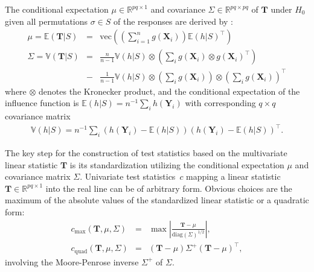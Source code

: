 \documentclass{article}
\newcommand{\Rpackage}[1]{{\normalfont\fontseries{b}\selectfont #1}}
\newcommand{\R}{\mathbb{R} }
\newcommand{\V}{\mathbb{V}} %
\newcommand{\E}{\mathbb{E}} %
\newcommand{\X}{\mathbf{X}}
\newcommand{\Y}{\mathbf{Y}}
\newcommand{\T}{\mathbf{T}}
\renewcommand{\vec}{\text{vec}}
\begin{document}
The conditional expectation $\mu \in \R^{pq \times 1}$ and covariance
$\Sigma \in \R^{pq \times pq}$ of $\T$ under $H_0$ given
all permutations $\sigma \in S$ of the responses are derived by
\cite{StrasserWeber1999}:
\begin{eqnarray*}
\mu = \E(\T | S) & = & \vec \left( \left( \sum_{i = 1}^n g(\X_i) \right)
\E(h | S)^\top \right) \\
\Sigma = \V(\T | S) & = &
    \frac{n}{n - 1}  \V(h | S) \otimes
        \left(\sum_i g(\X_i) \otimes  g(\X_i)^\top \right)
\\
& - & \frac{1}{n - 1}  \V(h | S)  \otimes \left(
        \sum_i g(\X_i) \right) \otimes \left( \sum_i g(\X_i)\right)^\top
\nonumber
\end{eqnarray*}
where $\otimes$ denotes the Kronecker product, and the conditional
expectation of the influence function is $\E(h | S) = n^{-1} \sum_i
h(\Y_i)$ with corresponding $q \times q$ covariance matrix
\begin{eqnarray*}
\V(h | S) = n^{-1} \sum_i \left(h(\Y_i) - \E(h | S) \right) \left(h(\Y_i) - \E(h | S)\right)^\top.
\end{eqnarray*}

The key step for the construction of test statistics based on the multivariate
linear statistic $\T$ is its standardization utilizing the 
conditional expectation $\mu$ and covariance matrix $\Sigma$. 
Univariate test statistics~$c$ mapping a linear
statistic $\T \in \R^{pq \times 1}$ 
into the real line can be of arbitrary form.  Obvious choices are
the maximum of the absolute values of the standardized linear statistic
or a quadratic form:
\begin{eqnarray*}
c_\text{max}(\T, \mu, \Sigma)  & = & \max \left| \frac{\T - \mu}{\text{diag}(\Sigma)^{1/2}} \right|, \\
c_\text{quad}(\T, \mu, \Sigma)  & = & (\T - \mu) \Sigma^+ (\T - \mu)^\top,
\end{eqnarray*}
involving the Moore-Penrose inverse $\Sigma^+$ of $\Sigma$.

\end{document}
